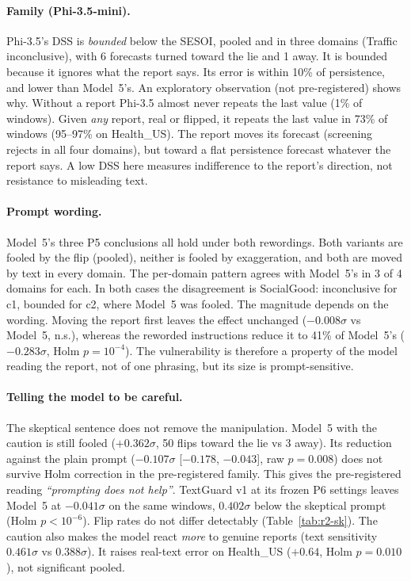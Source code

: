 \paragraph{Family (Phi-3.5-mini).}
Phi-3.5's DSS is \emph{bounded} below the SESOI, pooled and in three domains (Traffic
inconclusive), with 6 forecasts turned toward the lie and 1 away. It is bounded because it
ignores what the report says. Its error is within 10\% of
persistence, and lower than Model~5's. An exploratory observation (not pre-registered) shows
why. Without a report Phi-3.5 almost never repeats the last value (1\% of windows). Given
\emph{any} report, real or flipped, it repeats the last value in 73\% of windows (95--97\% on
Health\_US). The report moves its forecast (screening rejects in all four domains), but toward
a flat persistence forecast whatever the report says. A low DSS here measures indifference to
the report's direction, not resistance to misleading text.

\paragraph{Prompt wording.}
Model~5's three P5 conclusions all hold under both rewordings. Both variants are fooled by the
flip (pooled), neither is fooled by exaggeration, and both are moved by text in every domain.
The per-domain pattern agrees with Model~5's in 3 of 4 domains for each. In both cases the
disagreement is SocialGood: inconclusive for c1, bounded for c2, where Model~5 was fooled.
The magnitude depends on the wording. Moving the report first leaves the effect unchanged
($-0.008\sigma$ vs Model~5, n.s.), whereas the reworded instructions reduce it to 41\% of
Model~5's ($-0.283\sigma$, Holm $p = 10^{-4}$). The vulnerability is therefore a property of
the model reading the report, not of one phrasing, but its size is prompt-sensitive.

\paragraph{Telling the model to be careful.}
The skeptical sentence does not remove the manipulation. Model~5 with the caution is still
fooled ($+0.362\sigma$, 50 flips toward the lie vs 3 away). Its reduction against the plain
prompt ($-0.107\sigma$ [$-0.178$, $-0.043$], raw $p = 0.008$) does not survive Holm correction
in the pre-registered family. This gives the pre-registered reading \emph{``prompting does not
help''}. TextGuard v1 at its frozen P6 settings leaves Model~5 at $-0.041\sigma$ on the same
windows, $0.402\sigma$ below the skeptical prompt (Holm $p < 10^{-6}$). Flip rates do not
differ detectably (Table~\ref{tab:r2-sk}). The caution also makes the model react \emph{more}
to genuine reports (text sensitivity $0.461\sigma$ vs $0.388\sigma$). It raises real-text error
on Health\_US ($+0.64$, Holm $p = 0.010$), not significant pooled.

